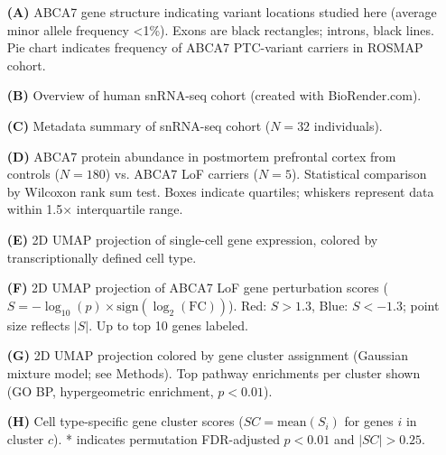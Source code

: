 \begin{itemize}
    \item[\textbf{(A)}] ABCA7 gene structure indicating variant locations studied here (average minor allele frequency <1\%). Exons are black rectangles; introns, black lines. Pie chart indicates frequency of ABCA7 PTC-variant carriers in ROSMAP cohort.
    \item[\textbf{(B)}] Overview of human snRNA-seq cohort (created with BioRender.com).
    \item[\textbf{(C)}] Metadata summary of snRNA-seq cohort ($N=32$ individuals).
    \item[\textbf{(D)}] ABCA7 protein abundance in postmortem prefrontal cortex from controls ($N=180$) vs. ABCA7 LoF carriers ($N=5$). Statistical comparison by Wilcoxon rank sum test. Boxes indicate quartiles; whiskers represent data within 1.5× interquartile range.
    \item[\textbf{(E)}] 2D UMAP projection of single-cell gene expression, colored by transcriptionally defined cell type.
    \item[\textbf{(F)}] 2D UMAP projection of ABCA7 LoF gene perturbation scores ($S = -\log_{10}(p)\times\text{sign}(\log_2(\text{FC}))$). Red: $S>1.3$, Blue: $S<-1.3$; point size reflects $|S|$. Up to top 10 genes labeled.
    \item[\textbf{(G)}] 2D UMAP projection colored by gene cluster assignment (Gaussian mixture model; see Methods). Top pathway enrichments per cluster shown (GO BP, hypergeometric enrichment, $p<0.01$).
    \item[\textbf{(H)}] Cell type-specific gene cluster scores ($SC=\text{mean}(S_i)$ for genes $i$ in cluster $c$). * indicates permutation FDR-adjusted $p<0.01$ and $|SC|>0.25$.
\end{itemize}